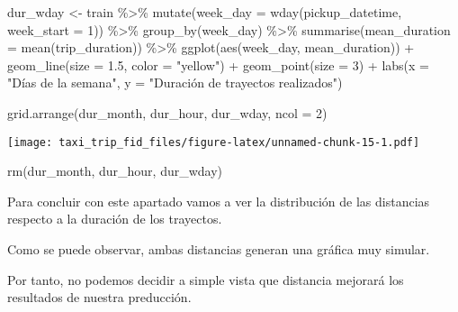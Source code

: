 \documentclass[
]{article}
\newenvironment{Shaded}{\begin{snugshade}}{\end{snugshade}}
\newcommand{\AttributeTok}[1]{\textcolor[rgb]{0.77,0.63,0.00}{#1}}
\newcommand{\DecValTok}[1]{\textcolor[rgb]{0.00,0.00,0.81}{#1}}
\newcommand{\FloatTok}[1]{\textcolor[rgb]{0.00,0.00,0.81}{#1}}
\newcommand{\FunctionTok}[1]{\textcolor[rgb]{0.00,0.00,0.00}{#1}}
\newcommand{\NormalTok}[1]{#1}
\newcommand{\OtherTok}[1]{\textcolor[rgb]{0.56,0.35,0.01}{#1}}
\newcommand{\SpecialCharTok}[1]{\textcolor[rgb]{0.00,0.00,0.00}{#1}}
\newcommand{\StringTok}[1]{\textcolor[rgb]{0.31,0.60,0.02}{#1}}
\begin{document}
\begin{Shaded}
\begin{Highlighting}[]
\NormalTok{dur\_wday }\OtherTok{\textless{}{-}}\NormalTok{ train }\SpecialCharTok{\%\textgreater{}\%}
  \FunctionTok{mutate}\NormalTok{(}\AttributeTok{week\_day =} \FunctionTok{wday}\NormalTok{(pickup\_datetime, }\AttributeTok{week\_start =} \DecValTok{1}\NormalTok{)) }\SpecialCharTok{\%\textgreater{}\%}
  \FunctionTok{group\_by}\NormalTok{(week\_day) }\SpecialCharTok{\%\textgreater{}\%}
  \FunctionTok{summarise}\NormalTok{(}\AttributeTok{mean\_duration =} \FunctionTok{mean}\NormalTok{(trip\_duration)) }\SpecialCharTok{\%\textgreater{}\%}
  \FunctionTok{ggplot}\NormalTok{(}\FunctionTok{aes}\NormalTok{(week\_day, mean\_duration)) }\SpecialCharTok{+}
  \FunctionTok{geom\_line}\NormalTok{(}\AttributeTok{size =} \FloatTok{1.5}\NormalTok{, }\AttributeTok{color =} \StringTok{"yellow"}\NormalTok{) }\SpecialCharTok{+}
  \FunctionTok{geom\_point}\NormalTok{(}\AttributeTok{size =} \DecValTok{3}\NormalTok{) }\SpecialCharTok{+} 
  \FunctionTok{labs}\NormalTok{(}\AttributeTok{x =} \StringTok{"Días de la semana"}\NormalTok{, }\AttributeTok{y =} \StringTok{"Duración de trayectos realizados"}\NormalTok{)}

\FunctionTok{grid.arrange}\NormalTok{(dur\_month, dur\_hour, dur\_wday, }\AttributeTok{ncol =} \DecValTok{2}\NormalTok{)}
\end{Highlighting}
\end{Shaded}

\texttt{[image: taxi\_trip\_fid\_files/figure-latex/unnamed-chunk-15-1.pdf]}

\begin{Shaded}
\begin{Highlighting}[]
\FunctionTok{rm}\NormalTok{(dur\_month, dur\_hour, dur\_wday)}
\end{Highlighting}
\end{Shaded}

Para concluir con este apartado vamos a ver la distribución de las
distancias respecto a la duración de los trayectos.

Como se puede observar, ambas distancias generan una gráfica muy
simular.

Por tanto, no podemos decidir a simple vista que distancia mejorará los
resultados de nuestra preducción.
\end{document}
